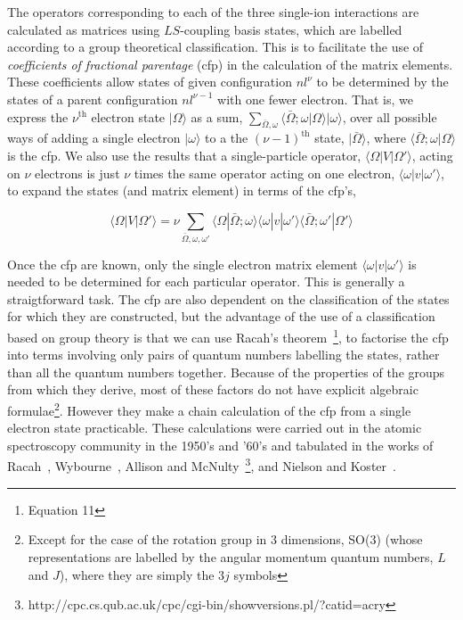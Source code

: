 The operators corresponding to each of the three single-ion interactions are calculated as matrices
using $LS$-coupling basis states, which are labelled according to a group theoretical
classification. This is to facilitate the use of \emph{coefficients of fractional parentage} (cfp)
in the calculation of the matrix elements. These coefficients allow states of given configuration
$nl^\nu$ to be determined by the states of a parent configuration $nl^{\nu-1}$ with one fewer electron.
That is, we express the $\nu^{\mathrm{th}}$ electron state $|\Omega\rangle$ as a sum,
$\sum_{\bar{\Omega},\omega} \langle\bar{\Omega};\omega|\Omega\rangle|\omega\rangle$, over all possible ways of
adding a single electron $|\omega\rangle$ to a the $(\nu-1)^{\mathrm{th}}$ state, $|\bar{\Omega}\rangle$,
where $\langle\bar{\Omega};\omega|\Omega\rangle$ is the cfp. We also use the results that a single-particle
operator, $\langle\Omega|V|\Omega'\rangle$, acting on $\nu$ electrons is just $\nu$ times the same operator 
acting on one electron, $\langle\omega|v|\omega'\rangle$, to expand the states (and matrix element) in
terms of the cfp's,

\[ \langle\Omega|V|\Omega'\rangle = \nu \sum_{\bar{\Omega},\omega,\omega'} \langle\Omega|\bar{\Omega};\omega\rangle
                                         \langle\omega|v|\omega'\rangle \langle\bar{\Omega};\omega'|\Omega'\rangle \]

\noindent Once the cfp are known, only the single electron matrix element $\langle\omega|v|\omega'\rangle$ 
is needed to be determined for each particular operator. This is generally a straigtforward task. The
cfp are also dependent on the classification of the states for which they are constructed, but the
advantage of the use of a classification based on group theory is that we can use Racah's
theorem~\cite{racah49-1352}\footnote{Equation 11}, to factorise the cfp into terms involving only
pairs of quantum numbers labelling the states, rather than all the quantum numbers together. Because
of the properties of the groups from which they derive, most of these factors do not have explicit
algebraic formulae\footnote{Except for the case of the rotation group in 3 dimensions, SO(3) (whose
representations are labelled by the angular momentum quantum numbers, $L$ and $J$), where they are
simply the $3j$ symbols}. However they make a chain calculation of the cfp from a single electron
state practicable. These calculations were carried out in the atomic spectroscopy community in the
1950's and '60's and tabulated in the works of Racah~\cite{racah49-1352}, Wybourne~\cite{wybourne61}, 
Allison and McNulty~\cite{allison74}\footnote{http://cpc.cs.qub.ac.uk/cpc/cgi-bin/showversions.pl/?catid=acry},
and Nielson and Koster~\cite{nielson63-1}.

